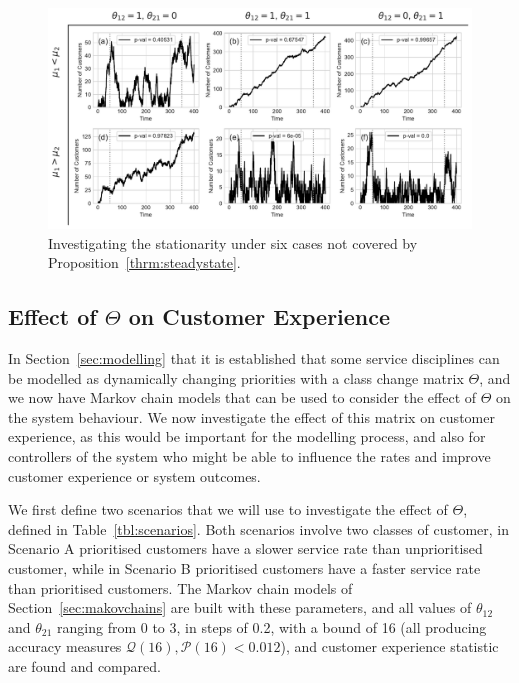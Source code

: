 \documentclass{article}
\begin{document}
\begin{figure}
  \begin{center}
    \includegraphics[width=\textwidth]{img/adf_theorem_gap.pdf}
    \caption{Investigating the stationarity under six cases not covered by
    Proposition~\ref{thrm:steadystate}.}
    \label{fig:adf_gap}
  \end{center}
\end{figure}



\subsection{Effect of $\Theta$ on Customer Experience}\label{sec:behaviour}
In Section~\ref{sec:modelling} that it is established that some service
disciplines can be modelled as dynamically changing priorities with a class
change matrix $\Theta$, and we now have Markov chain models that can be used to
consider the effect of $\Theta$ on the system behaviour. We now investigate the
effect of this matrix on customer experience, as this would be important for the
modelling process, and also for controllers of the system who might be able to
influence the rates and improve customer experience or system outcomes.

We first define two scenarios that we will use to investigate the effect of
$\Theta$, defined in Table~\ref{tbl:scenarios}. Both scenarios involve two
classes of customer, in Scenario A prioritised customers have a slower service
rate than unprioritised customer, while in Scenario B prioritised customers have
a faster service rate than prioritised customers. The Markov chain models of
Section~\ref{sec:makovchains} are built with these parameters, and all values
of $\theta_{12}$ and $\theta_{21}$ ranging from 0 to 3, in steps of 0.2, with a
bound of 16 (all producing accuracy measures
$\mathcal{Q}(16), \mathcal{P}(16) < 0.012$),
and customer experience statistic are found and compared.
\end{document}
